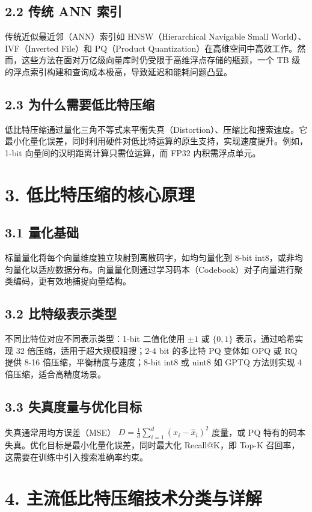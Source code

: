\section{2.2 传统 ANN 索引}
传统近似最近邻（ANN）索引如 HNSW（Hierarchical Navigable Small World）、IVF（Inverted File）和 PQ（Product Quantization）在高维空间中高效工作。然而，这些方法在面对万亿级向量库时仍受限于高维浮点存储的瓶颈，一个 TB 级的浮点索引构建和查询成本极高，导致延迟和能耗问题凸显。\par
\section{2.3 为什么需要低比特压缩}
低比特压缩通过量化三角不等式来平衡失真（Distortion）、压缩比和搜索速度。它最小化量化误差，同时利用硬件对低比特运算的原生支持，实现速度提升。例如，1-bit 向量间的汉明距离计算只需位运算，而 FP32 内积需浮点单元。\par
\chapter{3. 低比特压缩的核心原理}
\section{3.1 量化基础}
标量量化将每个向量维度独立映射到离散码字，如均匀量化到 8-bit int8，或非均匀量化以适应数据分布。向量量化则通过学习码本（Codebook）对子向量进行聚类编码，更有效地捕捉向量结构。\par
\section{3.2 比特级表示类型}
不同比特位对应不同表示类型：1-bit 二值化使用 $\pm 1$ 或 $\{0,1\}$ 表示，通过哈希实现 32 倍压缩，适用于超大规模粗搜；2-4 bit 的多比特 PQ 变体如 OPQ 或 RQ 提供 8-16 倍压缩，平衡精度与速度；8-bit int8 或 uint8 如 GPTQ 方法则实现 4 倍压缩，适合高精度场景。\par
\section{3.3 失真度量与优化目标}
失真通常用均方误差（MSE） $D = \frac{1}{d} \sum_{i=1}^d (x_i - \hat{x}_i)^2$ 度量，或 PQ 特有的码本失真。优化目标是最小化量化误差，同时最大化 Recall@K，即 Top-K 召回率，这需要在训练中引入搜索准确率约束。\par
\chapter{4. 主流低比特压缩技术分类与详解}
